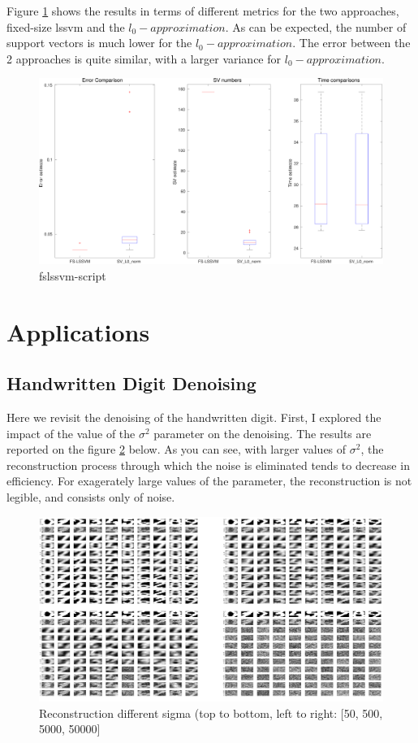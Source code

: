 \documentclass[11pt, a4paper]{article}
\begin{document}
Figure \ref{fig:fslssvm_script} shows the results in terms of
different metrics for the two approaches, fixed-size lssvm and the
$l_0-approximation$. As can be expected, the number of support vectors
is much lower for the $l_0-approximation$. The error between the 2
approaches is quite similar, with a larger variance for
$l_0-approximation$.

\begin{figure}[H]
  \centering
  \includegraphics[scale=.36]{fslssvm_script.pdf}
  \caption{fslssvm-script}
  \label{fig:fslssvm_script}
\end{figure}


\newpage
\section{Applications}

\subsection{Handwritten Digit Denoising}

Here we revisit the denoising of the handwritten digit. First, I
explored the impact of the value of the $\sigma^2$ parameter on the
denoising. The results are reported on the figure
\ref{fig:nndigits_all} below. As you can see, with larger values of
$\sigma^2$, the reconstruction process through which the noise is
eliminated tends to decrease in efficiency. For exagerately large
values of the parameter, the reconstruction is not legible, and
consists only of noise.

\begin{figure}[H]
  \centering
  \includegraphics[scale=.13]{nndigits_all.png}
  \caption{Reconstruction different sigma (top to bottom, left to
    right: [50, 500, 5000, 50000]}
  \label{fig:nndigits_all}
\end{figure}
\end{document}
